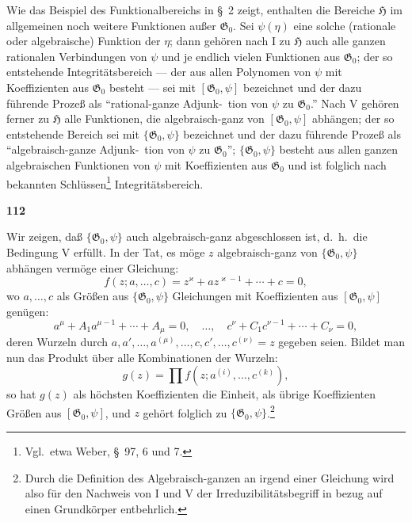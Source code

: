 \documentclass[12pt,a4paper]{article}
\begin{document}
Wie das Beispiel des Funktionalbereichs in \S\ 2 zeigt, enthalten die Bereiche $\mathfrak{H}$ im allgemeinen noch weitere Funktionen au\ss er $\mathfrak{G}_0$. Sei $\psi(\eta)$ eine solche (rationale oder algebraische) Funktion der $\eta$; dann geh\"oren nach I zu $\mathfrak{H}$ auch alle ganzen rationalen Verbindungen von $\psi$ und je endlich vielen Funktionen aus $\mathfrak{G}_0$; der so entstehende Integrit\"atsbereich --- der aus allen Polynomen von $\psi$ mit Koeffizienten aus $\mathfrak{G}_0$ besteht --- sei mit $[\mathfrak{G}_0, \psi]$ bezeichnet und der dazu f\"uhrende Proze\ss{} als ``rational-ganze Adjunk-\ tion von $\psi$ zu $\mathfrak{G}_0$.'' Nach V geh\"oren ferner zu $\mathfrak{H}$ alle Funktionen, die algebraisch-ganz von $[\mathfrak{G}_0, \psi]$ abh\"angen; der so entstehende Bereich sei mit $\{\mathfrak{G}_0, \psi\}$ bezeichnet und der dazu f\"uhrende Proze\ss{} als ``algebraisch-ganze Adjunk-\ tion von $\psi$ zu $\mathfrak{G}_0$''; $\{\mathfrak{G}_0, \psi\}$ besteht aus allen ganzen algebraischen Funktionen von $\psi$ mit Koeffizienten aus $\mathfrak{G}_0$ und ist folglich nach bekannten Schl\"ussen\footnote{Vgl.\ etwa Weber, \S\ 97, 6 und 7.} Integrit\"atsbereich.

\newpage
\begin{center}
\textbf{112}
\end{center}

Wir zeigen, da\ss{} $\{\mathfrak{G}_0, \psi\}$ auch algebraisch-ganz abgeschlossen ist, d.\ h.\ die Bedingung V erf\"ullt. In der Tat, es m\"oge $z$ algebraisch-ganz von $\{\mathfrak{G}_0, \psi\}$ abh\"angen verm\"oge einer Gleichung:
\[f(z; a, \ldots, c) = z^{\varkappa} + a z^{\varkappa-1} + \cdots + c = 0,\]
wo $a, \ldots, c$ als Gr\"o\ss en aus $\{\mathfrak{G}_0, \psi\}$ Gleichungen mit Koeffizienten aus $[\mathfrak{G}_0, \psi]$ gen\"ugen:
\[a^{\mu} + A_1 a^{\mu-1} + \cdots + A_{\mu} = 0, \quad \ldots, \quad c^{\nu} + C_1 c^{\nu-1} + \cdots + C_{\nu} = 0,\]
deren Wurzeln durch $a, a', \ldots, a^{(\mu)}, \ldots, c, c', \ldots, c^{(\nu)} = z$ gegeben seien. Bildet man nun das Produkt \"uber alle Kombinationen der Wurzeln:
\[g(z) = \prod f(z; a^{(i)}, \ldots, c^{(k)}),\]
so hat $g(z)$ als h\"ochsten Koeffizienten die Einheit, als \"ubrige Koeffizienten Gr\"o\ss en aus $[\mathfrak{G}_0, \psi]$, und $z$ geh\"ort folglich zu $\{\mathfrak{G}_0, \psi\}$.\footnote{Durch die Definition des Algebraisch-ganzen an irgend einer Gleichung wird also f\"ur den Nachweis von I und V der Irreduzibilit\"atsbegriff in bezug auf einen Grundk\"orper entbehrlich.}
\end{document}
